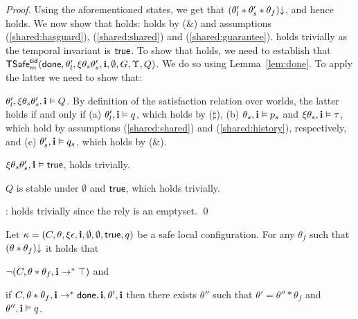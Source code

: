 \begin{proof}
Using the aforementioned states, we get that 
$(\theta'_l * \theta'_s * \theta_f)\mathpunct{\downarrow}$, 
and hence  holds.
We now show that  holds:
 holds by ($\&$) and assumptions (\ref{shared:hasguard}), (\ref{shared:shared}) and 
(\ref{shared:guarantee}).
 holds trivially as the temporal invariant is $\mathsf{true}$.
To show that  holds,
we need to establish that
${\sf TSafe}^{{\sf tid}}_m({\sf done},\theta'_l,\xi\theta_s\theta'_s,{\bf i},\emptyset,G,\Upsilon,Q)$. We do so using Lemma~\ref{lem:done}.
To apply the latter we need to show that:
\begin{compactenum}[(i)]
\item $\theta'_l,\xi\theta_s\theta_s',{\bf i} \vDash Q$.
By definition of the satisfaction relation over worlds, 
the latter holds if and only if
(a) $\theta'_l,{\bf i} \vDash q$, which  holds by ($\sharp$),
(b) $\theta_s,{\bf i} \vDash p_s$ and $\xi\theta_s,{\bf i} \vDash \tau$, which hold  by
assumptions (\ref{shared:shared}) and (\ref{shared:history}), respectively, and  
(c) $\theta'_s,{\bf i} \vDash q_s$, which holds by  ($\&$).
\item $\xi\theta_s\theta_s',{\bf i} \vDash \mathsf{true}$, holds trivially.
\item $Q$ is stable under $\emptyset$ and $\mathsf{true}$, which holds trivially.
\end{compactenum}

: holds trivially since the rely is an emptyset.
\qed\end{proof}





\begin{lemma}\label{lem:safeloc:run}
  Let  $\kappa = (C,\theta,\xi\epsilon,{\bf i},\emptyset,\emptyset,\mathsf{true}, q)$ 
  be a safe  local configuration.
  For any $\theta_f$ such that $(\theta*\theta_f)\mathpunct{\downarrow}$ it holds that
  \begin{compactenum}
    \item \label{lem:safeloc:noabort} 
    $\neg(C,\theta * \theta_f,{\bf i} \rightarrow^* \top)$ and
    \item \label{lem:safeloc:post} if 
      $C,\theta * \theta_f,{\bf i} \rightarrow^* {\sf done},{\bf i},\theta',{\bf i}$
    then there exists $\theta''$ such that $\theta' = \theta'' * \theta_f$
    and $\theta'',{\bf i} \vDash q$.
%    
  \end{compactenum}
\end{lemma}

